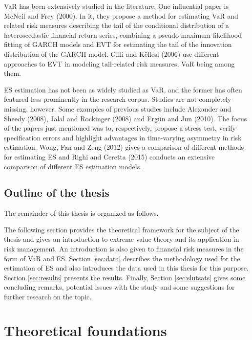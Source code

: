\documentclass[a4paper,11pt]{article}
\theoremstyle{definition}
\theoremstyle{definition}
\theoremstyle{definition}
\theoremstyle{definition}
\theoremstyle{remark}
\begin{document}
VaR has been extensively studied in the literature. One influential paper is McNeil and Frey (2000). In it, they propose a method for estimating VaR and related risk measures describing the tail of the conditional distribution of a heteroscedastic financial return series, combining a pseudo-maximum-likelihood fitting of GARCH models and EVT for estimating the tail of the innovation distribution of the GARCH model. Gilli and Këllesi (2006) use different approaches to EVT in modeling tail-related risk measures, VaR being among them.

ES estimation has not been as widely studied as VaR, and the former has often featured less prominently in the research corpus. Studies are not completely missing, however. Some examples of previous studies include Alexander and Sheedy (2008), Jalal and Rockinger (2008) and Ergün and Jun (2010). The focus of the papers just mentioned was to, respectively, propose a stress test, verify specification errors and highlight advantages in time-varying asymmetry in risk estimation. Wong, Fan and Zeng (2012) gives a comparison of different methods for estimating ES and Righi and Ceretta (2015) conducts an extensive comparison of different ES estimation models.

\hypertarget{outline-of-the-thesis}{%
\subsection{Outline of the thesis}\label{outline-of-the-thesis}}

The remainder of this thesis is organized as follows.

The following section provides the theoretical framework for the subject of the thesis and gives an introduction to extreme value theory and its application in risk management. An introduction is also given to financial risk measures in the form of VaR and ES. Section \ref{sec:data} describes the methodology used for the estimation of ES and also introduces the data used in this thesis for this purpose. Section \ref{sec:results} presents the results. Finally, Section \ref{sec:slutsats} gives some concluding remarks, potential issues with the study and some suggestions for further research on the topic.

\newpage

\hypertarget{sec:method}{%
\section{Theoretical foundations}\label{sec:method}}
\end{document}
